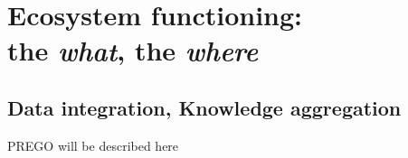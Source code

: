 \chapter{Ecosystem functioning: \\ 
the \textit{what}, the \textit{where}}
\label{cha:3}


\section{Data integration, Knowledge aggregation}
PREGO will be described here

